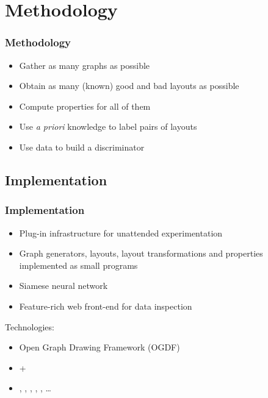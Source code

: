 \documentclass{beamer}
\begin{document}
\begin{frame}
\end{frame}

\section{Methodology}
\begin{frame}
  \frametitle{Methodology}
  \begin{itemize}
  \item Gather as many graphs as possible
  \item Obtain as many (known) good and bad layouts as possible
  \item Compute properties for all of them
  \item Use \emph{a priori} knowledge to label pairs of layouts
  \item Use data to build a discriminator
  \end{itemize}
\end{frame}

\subsection{Implementation}
\begin{frame}
  \frametitle{Implementation}
  \begin{itemize}
  \item Plug-in infrastructure for unattended experimentation
  \item Graph generators, layouts, layout transformations and properties implemented as small programs
  \item Siamese neural network
  \item Feature-rich web front-end for data inspection
  \end{itemize}
  \par\bigskip
  Technologies:
  \par\smallskip
  \begin{itemize}
  \item Open Graph Drawing Framework (OGDF)
  \item {\Keras} + {\TensorFlow}
  \item {\CXX}, {\Python}, {\SQLite}, {\XSLT}, {\CMake}, \dots
  \end{itemize}
\end{frame}
\end{document}
